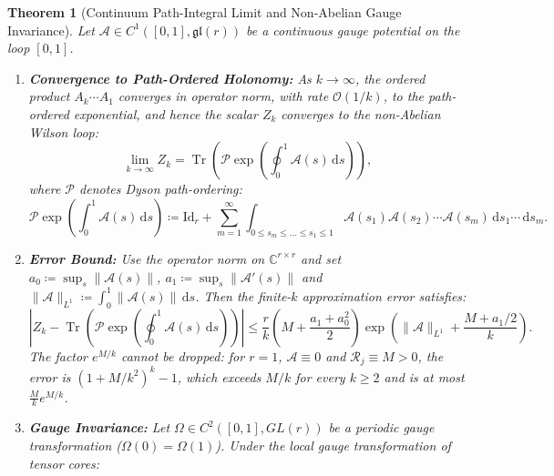 \documentclass[11pt,a4paper,reqno]{amsart}
\newtheorem{theorem}{Theorem}[section]
\theoremstyle{definition}
\numberwithin{equation}{section}
\newcommand{\C}{\mathbb{C}}
\newcommand{\Id}{\mathrm{Id}}
\newcommand{\Tr}{\operatorname{Tr}}
\newcommand{\dif}{\,\mathrm{d}}
\begin{document}
\begin{theorem}[Continuum Path-Integral Limit and Non-Abelian Gauge Invariance]
\label{thm:continuous_path_integral}
Let $\mathcal{A} \in C^1([0, 1], \mathfrak{gl}(r))$ be a continuous gauge potential on the loop $[0, 1]$.
\begin{enumerate}[label=(\roman*)]
    \item \textbf{Convergence to Path-Ordered Holonomy:} As $k \to \infty$, the ordered product $A_k \cdots A_1$ converges in operator norm, with rate $\mathcal{O}(1/k)$, to the path-ordered exponential, and hence the scalar $Z_k$ converges to the non-Abelian Wilson loop:
    \begin{equation}
        \label{eq:path_ordered_limit}
        \lim_{k \to \infty} Z_k = \Tr\left( \mathcal{P} \exp\left( \oint_0^1 \mathcal{A}(s) \dif s \right) \right),
    \end{equation}
    where $\mathcal{P}$ denotes Dyson path-ordering:
    \begin{equation}
        \mathcal{P} \exp\left( \int_0^1 \mathcal{A}(s) \dif s \right) \coloneqq \Id_r + \sum_{m=1}^\infty \int_{0 \le s_m \le \dots \le s_1 \le 1} \mathcal{A}(s_1) \mathcal{A}(s_2) \cdots \mathcal{A}(s_m) \dif s_1 \cdots \dif s_m.
    \end{equation}
    \item \textbf{Error Bound:} Use the operator norm on $\C^{r \times r}$ and set $a_0 \coloneqq \sup_s \|\mathcal{A}(s)\|$, $a_1 \coloneqq \sup_s \|\mathcal{A}'(s)\|$ and $\|\mathcal{A}\|_{L^1} \coloneqq \int_0^1 \|\mathcal{A}(s)\| \dif s$. Then the finite-$k$ approximation error satisfies:
    \begin{equation}
        \label{eq:dyson_error_bound}
        \left| Z_k - \Tr\left( \mathcal{P} \exp\left( \oint_0^1 \mathcal{A}(s) \dif s \right) \right) \right| \le \frac{r}{k} \left( M + \frac{a_1 + a_0^2}{2} \right) \exp\left( \|\mathcal{A}\|_{L^1} + \frac{M + a_1/2}{k} \right).
    \end{equation}
    The factor $e^{M/k}$ cannot be dropped: for $r = 1$, $\mathcal{A} \equiv 0$ and $\mathcal{R}_j \equiv M > 0$, the error is $(1 + M/k^2)^k - 1$, which exceeds $M/k$ for every $k \ge 2$ and is at most $\frac{M}{k}e^{M/k}$.
    \item \textbf{Gauge Invariance:} Let $\Omega \in C^2([0, 1], GL(r))$ be a periodic gauge transformation ($\Omega(0) = \Omega(1)$). Under the local gauge transformation of tensor cores:
    \begin{equation}
        \label{eq:continuous_gauge_field}

\end{equation}
\end{enumerate}
\end{theorem}
\end{document}
